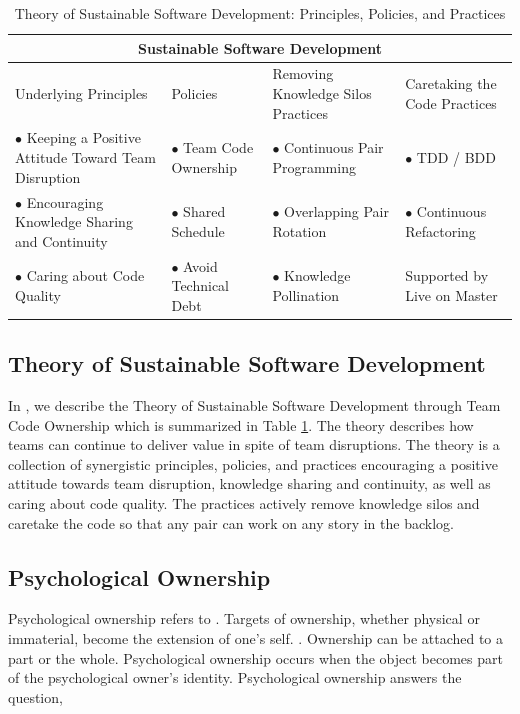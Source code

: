 \begin{table}[t]
\renewcommand{\arraystretch}{1.5}
\centering
\caption{Theory of Sustainable Software Development: Principles, Policies, and Practices}
\label{SustainableSoftwareDevelopmentTable}
\begin{tabular}{|p{1.65in}|p{1.35in}|p{1.8in}|p{1.6in}|}
\hline
\multicolumn{4}{|c|}{Sustainable Software Development}                     \\
\hline
Underlying Principles & Policies                  & Removing Knowledge Silos Practices & Caretaking the Code Practices       \\
$\bullet$ Keeping a Positive Attitude Toward Team Disruption & $\bullet$ Team Code Ownership & $\bullet$ Continuous Pair Programming         & $\bullet$  TDD / BDD                   \\
$\bullet$ Encouraging Knowledge Sharing and Continuity & $\bullet$ Shared Schedule           & $\bullet$ Overlapping Pair Rotation & $\bullet$ Continuous Refactoring      \\
$\bullet$ Caring about Code Quality  & $\bullet$ Avoid Technical Debt      & $\bullet$  Knowledge Pollination    & Supported by Live on Master \\ 
\hline
\end{tabular}
\end{table}

\subsection{Theory of Sustainable Software Development}
\label{SustainableSoftwareDevelopmentTheory}
In \cite{SustainableSoftwareDevelopment}, we describe the Theory of Sustainable Software Development through Team Code Ownership which is summarized in Table \ref{SustainableSoftwareDevelopmentTable}. The theory describes how teams can continue to deliver value in spite of team disruptions. The theory is a collection of synergistic principles, policies, and practices encouraging a positive attitude towards team disruption, knowledge sharing and continuity, as well as caring about code quality. The practices actively remove knowledge silos and caretake the code so that any pair can work on any story in the backlog. 

\subsection{Psychological Ownership}
Psychological ownership refers to  \cite{Pierce2001}. Targets of ownership, whether physical or immaterial, become the extension of one's self.  \cite{Isaacs1933}. Ownership can be attached to a part or the whole. Psychological ownership occurs when the object becomes part of the psychological owner's identity. Psychological ownership answers the question, 

